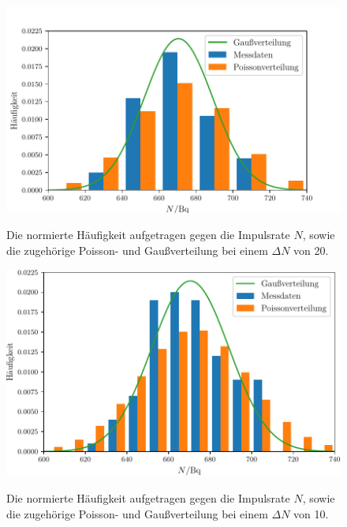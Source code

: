 \begin{figure}
	\centering
	\caption{Die normierte Häufigkeit aufgetragen gegen die Impulsrate $N$, sowie die zugehörige Poisson- und Gaußverteilung bei einem $\Delta N$ von 20.}
	\includegraphics[width=\linewidth-70pt,height=\textheight-70pt,keepaspectratio]{content/images/Graph3_20.pdf}
	\label{fig:3_20}
\end{figure}
\begin{figure}
	\centering
	\caption{Die normierte Häufigkeit aufgetragen gegen die Impulsrate $N$, sowie die zugehörige Poisson- und Gaußverteilung bei einem $\Delta N$ von 10.}
	\includegraphics[width=\linewidth-70pt,height=\textheight-70pt,keepaspectratio]{content/images/Graph3_10.pdf}
	\label{fig:3_10}
\end{figure}
